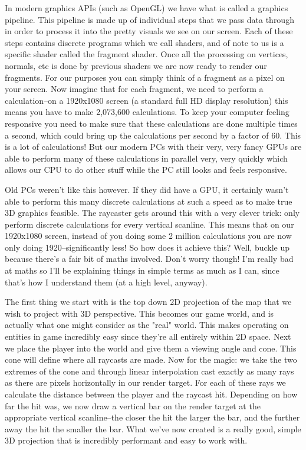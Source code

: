 \documentclass{article}
\begin{document}
In modern graphics APIs (such as OpenGL) we have what is called a graphics
pipeline. This pipeline is made up of individual steps that we pass data through
in order to process it into the pretty visuals we see on our screen. Each of
these steps contains discrete programs which we call shaders, and of note to us
is a specific shader called the fragment shader. Once all the processing on
vertices, normals, etc is done by previous shaders we are now ready to render
our fragments. For our purposes you can simply think of a fragment as a pixel on
your screen. Now imagine that for each fragment, we need to perform a
calculation--on a 1920x1080 screen (a standard full HD display resolution) this
means you have to make 2,073,600 calculations. To keep your computer feeling
responsive you need to make sure that these calculations are done multiple times
a second, which could bring up the calculations per second by a factor of 60.
This is a lot of calculations! But our modern PCs with their very, very fancy
GPUs are able to perform many of these calculations in parallel very, very
quickly which allows our CPU to do other stuff while the PC still looks and
feels responsive.

Old PCs weren't like this however. If they did have a GPU, it certainly wasn't
able to perform this many discrete calculations at such a speed as to make true
3D graphics feasible. The raycaster gets around this with a very clever trick:
only perform discrete calculations for every vertical scanline. This means that
on our 1920x1080 screen, instead of you doing some 2 million calculations you
are now only doing 1920--significantly less! So how does it achieve this? Well,
buckle up because there's a fair bit of maths involved. Don't worry though! I'm
really bad at maths so I'll be explaining things in simple terms as much as I
can, since that's how I understand them (at a high level, anyway).

The first thing we start with is the top down 2D projection of the map that we
wish to project with 3D perspective. This becomes our game world, and is
actually what one might consider as the "real" world. This makes operating on
entities in game incredibly easy since they're all entirely within 2D space.
Next we place the player into the world and give them a viewing angle and cone.
This cone will define where all raycasts are made. Now for the magic: we take
the two extremes of the cone and through linear interpolation cast exactly as
many rays as there are pixels horizontally in our render target. For each of
these rays we calculate the distance between the player and the raycast hit.
Depending on how far the hit was, we now draw a vertical bar on the render
target at the appropriate vertical scanline--the closer the hit the larger the
bar, and the further away the hit the smaller the bar. What we've now created
is a really good, simple 3D projection that is incredibly performant and easy to
work with.
\end{document}
